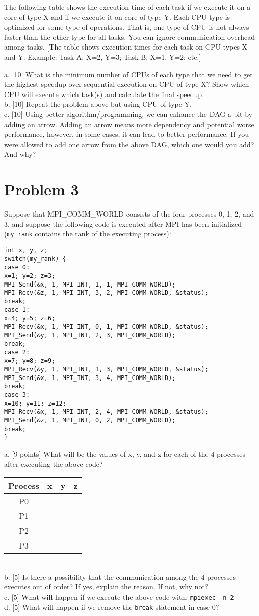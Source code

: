 \documentclass{article}
\begin{document}
The following table shows the execution time of each task if we execute it on a core of type X and if we execute it on core of type Y. Each CPU type is optimized for some type of operations. That is, one type of CPU is not always faster than the other type for all tasks. You can ignore communication overhead among tasks.
[The table shows execution times for each task on CPU types X and Y. Example: Task A: X=2, Y=3; Task B: X=1, Y=2; etc.]

a. [10] What is the minimum number of CPUs of each type that we need to get the highest speedup over sequential execution on CPU of type X? Show which CPU will execute which task(s) and calculate the final speedup. \\
b. [10] Repeat the problem above but using CPU of type Y. \\
c. [10] Using better algorithm/programming, we can enhance the DAG a bit by adding an arrow. Adding an arrow means more dependency and potential worse performance, however, in some cases, it can lead to better performance. If you were allowed to add one arrow from the above DAG, which one would you add? And why?


\section*{Problem 3}
Suppose that MPI\_COMM\_WORLD consists of the four processes 0, 1, 2, and 3, and suppose the following code is executed after MPI has been initialized (\texttt{my\_rank} contains the rank of the executing process):

\begin{verbatim}
int x, y, z;
switch(my_rank) {
case 0:
x=1; y=2; z=3;
MPI_Send(&x, 1, MPI_INT, 1, 1, MPI_COMM_WORLD);
MPI_Recv(&z, 1, MPI_INT, 3, 2, MPI_COMM_WORLD, &status);
break;
case 1:
x=4; y=5; z=6;
MPI_Recv(&x, 1, MPI_INT, 0, 1, MPI_COMM_WORLD, &status);
MPI_Send(&y, 1, MPI_INT, 2, 3, MPI_COMM_WORLD);
break;
case 2:
x=7; y=8; z=9;
MPI_Recv(&y, 1, MPI_INT, 1, 3, MPI_COMM_WORLD, &status);
MPI_Send(&x, 1, MPI_INT, 3, 4, MPI_COMM_WORLD);
break;
case 3:
x=10; y=11; z=12;
MPI_Recv(&x, 1, MPI_INT, 2, 4, MPI_COMM_WORLD, &status);
MPI_Send(&z, 1, MPI_INT, 0, 2, MPI_COMM_WORLD);
break;
}
\end{verbatim}

a. [9 points] What will be the values of x, y, and z for each of the 4 processes after executing the above code?
\begin{tabular}{|c|c|c|c|}
\hline
Process & x & y & z \\
\hline
P0 &  &  &  \\
\hline
P1 &  &  &  \\
\hline
P2 &  &  &  \\
\hline
P3 &  &  &  \\
\hline
\end{tabular} \\
b. [5] Is there a possibility that the communication among the 4 processes executes out of order? If yes, explain the reason. If not, why not? \\
c. [5] What will happen if we execute the above code with: \texttt{mpiexec –n 2} \\
d. [5] What will happen if we remove the \texttt{break} statement in case 0?
\end{document}
